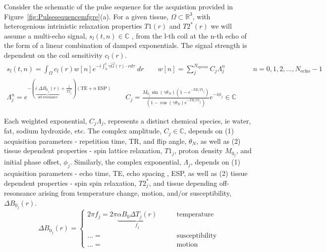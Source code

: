 \documentclass{article}         %
\theoremstyle{definition}
\theoremstyle{remark}
\begin{document}
Consider the schematic of the pulse sequence for the  acquistion provided in
Figure~\ref{fig:Pulsesequencemfgre}(a).
For a  given tissue, $\Omega \subset \mathbb{R}^3$,
with heterogenious intrinistic relaxation properties $T1(r)$ and $T2^*(r)$
we will assume a multi-echo signal, $s_l(t,n)\in\mathbb{C}$ ,
from the l-th coil at the n-th echo 
of the form of a linear combination of damped exponentials. 
The signal strength is dependent on the coil sensitivity $c_l(r)$.
\begin{equation}
\label{multiechosignalmodel}
\begin{split}
 s_l(t,n) = \int_\Omega c_l(r)  w[n] e^{-i \int_0^t \gamma \vec{G}(\tau)\cdot r d \tau} \; dr
\qquad
 w[n]  = \sum_j^{N_\text{species}} 
 C_j \Lambda_j^n 
  \qquad  \qquad n = 0,1,2,\dots,N_\text{echo}-1
\\
\Lambda_j^n  = e^{-\left( 
\underbrace{i\; \Delta B_{0_j}(r) }_\text{off-resonance} 
+
\frac{1}{T2^*_j} \right) \left( \text{TE} + n \; \text{ESP}\right) } 
\quad  \quad
C_j = \frac{M_{0_j} \sin \left(\gamma \theta_N \right)\left( 1- e^{-TR/T1_j}\right)}{\left( 1- \cos \left(\gamma \theta_N \right) e^{-TR/T1_j}\right)}
e^{-i  \phi_j} 
\in  \mathbb{C} 
\end{split}
\end{equation}

Each weighted exponential, $C_j \Lambda_j$, represents a distinct chemical species,
ie water, fat, sodium hydroxide, etc. 
The complex amplitude,
$C_j \in \mathbb{C}$, 
depends on (1) acquisition parameters - repetition time, TR,
and flip angle, $\theta_N$, as well as (2) tissue dependent properties -
 spin lattice relaxation,  $T1_j$,
 proton density $M_{0_j}$, and
 initial phase offset, $\phi_j$.
Similarly, the complex exponential, $\Lambda_j$,
depends on (1) acquisition parameters - echo time, TE,
echo spacing , ESP, as well as (2) tissue dependent properties -
 spin spin relaxation,  $T2^*_j$, and tissue depending off-resonsance
arising from temperature change, motion, and/or susceptibility, 
$\Delta B_{0_j}(r)$.
\[
 \Delta B_{0_j}(r) = 
\left\{ 
\begin{split}
                2\pi f_j = 2\pi \underbrace{\alpha B_0 \Delta T_j(r)}_{f_j} & \qquad \text{temperature}   
\\
                ... =      & \qquad \text{susceptibility}   
\\
                ... =      & \qquad \text{motion}   
\end{split}
\right.
\]
\end{document}

